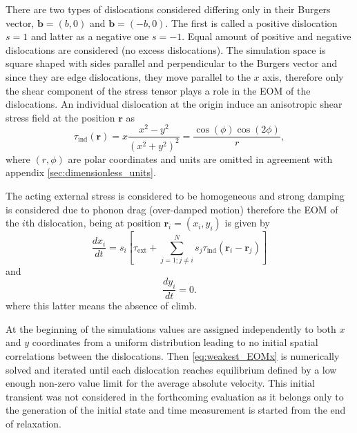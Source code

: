 There are two types of dislocations considered differing only in their Burgers vector, ${\mathbf{b}} = \left( {b,0} \right)$ and ${\mathbf{b}} = \left( {-b,0} \right)$. The first is called a positive dislocation $s=1$ and latter as a negative one $s=-1$. Equal amount of positive and negative dislocations are considered (no excess dislocations). The simulation space is square shaped with sides parallel and perpendicular to the Burgers vector and since they are edge dislocations, they move parallel to the $x$ axis, therefore only the shear component of the stress tensor plays a role in the EOM of the dislocations. An individual dislocation at the origin induce an anisotropic shear stress field at the position ${\mathbf{r}}$ as 
\begin{equation}
{\tau _{{\text{ind}}}}\left( {\mathbf{r}} \right) = x\frac{{{x^2} - {y^2}}}{{{{\left( {{x^2} + {y^2}} \right)}^2}}} = \frac{{\cos \left( \phi  \right)\cos \left( {2\phi } \right)}}{r},
\end{equation}
where $\left( {r,\phi } \right)$ are polar coordinates and units are omitted in agreement with appendix \ref{sec:dimensionless_units}.

The acting external stress is considered to be homogeneous and strong damping is considered due to phonon drag (over-damped motion) therefore the EOM of the $i$th dislocation, being at position ${{\mathbf{r}}_i} = \left( {{x_i},{y_i}} \right)$ is given by 
\begin{equation} \label{eq:weakest_EOMx}
\frac{{d{x_i}}}{{dt}} = {s_i}\left[ {{\tau _{{\text{ext}}}} + \sum\limits_{j = 1;j \ne i}^N {{s_j}{\tau _{{\text{ind}}}}\left( {{{\mathbf{r}}_i} - {{\mathbf{r}}_j}} \right)} } \right]
\end{equation}
and
\begin{equation} \label{eq:weakest_EOMy}
\frac{{d{y_i}}}{{dt}} = 0.
\end{equation}
where this latter means the absence of climb.

At the beginning of the simulations values are assigned independently to both $x$ and $y$ coordinates from a uniform distribution leading to no initial spatial correlations between the dislocations. Then \cref{eq:weakest_EOMx} is numerically solved and iterated until each dislocation reaches equilibrium defined by a low enough non-zero value limit for the average absolute velocity. This initial transient was not considered in the forthcoming evaluation as it belongs only to the generation of the initial state and time measurement is started from the end of relaxation.

